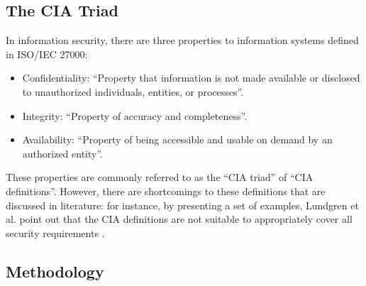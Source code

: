 \subsection{The CIA Triad}
In information security, there are three properties to information systems defined in \ac{ISO}/\ac{IEC} 27000:
\begin{itemize}
    \item Confidentiality: \enquote{Property that information is not made available or disclosed to unauthorized individuals, entities, or processes}. \cite{ISOIEC27000}
    \item Integrity: \enquote{Property of accuracy and completeness}. \cite{ISOIEC27000}
    \item Availability: \enquote{Property of being accessible and usable on demand by an authorized entity}. \cite{ISOIEC27000}
\end{itemize}
These properties are commonly referred to as the \enquote{CIA triad} of \enquote{CIA definitions}. However, there are shortcomings to these definitions that are discussed in literature: for instance, by presenting a set of examples, Lundgren et al. point out that the CIA definitions are not suitable to appropriately cover all security requirements \cite{Lundgren2019DefiningIS}.

\subsection{Methodology}
